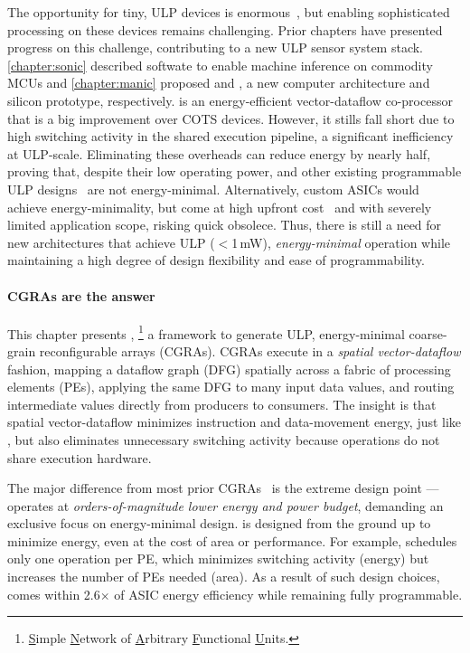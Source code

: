 The opportunity for tiny, ULP devices is enormous~\cite{lucia2017intermittent}, but enabling sophisticated processing on these devices remains challenging.
% 
Prior chapters have presented progress on this challenge, contributing to a new ULP sensor system stack.
% 
\autoref{chapter:sonic} described softwate to enable machine inference on commodity MCUs and \autoref{chapter:manic} proposed \manic and \msilicon, a new computer architecture and silicon prototype, respectively.
% 
\manic is an energy-efficient vector-dataflow co-processor that is a big improvement over COTS devices.
% 
However, it stills fall short due to high switching activity
in the shared execution pipeline, a significant inefficiency at ULP-scale.
% 
Eliminating these overheads can reduce energy by nearly half, proving that, despite their low operating power, \manic and other existing programmable ULP designs~\cite{dally:ieee08:elm,hempstead2005ultra,warneke200417,nazhandali2005energy} are not energy-minimal.
% 
Alternatively, custom ASICs would achieve energy-minimality, but come at high upfront cost~\cite{hotmobile2021} and with severely limited application scope, risking quick obsolece.
% 
Thus, there is still a need for new architectures that achieve ULP ($<$1\,mW), \emph{energy-minimal} operation while maintaining a high degree of design flexibility and ease of programmability.

\paragraph{\Ulp CGRAs are the answer}
%
This chapter presents \snafuframe,%
\footnote{\underline{S}imple \underline{N}etwork of \underline{A}rbitrary \underline{F}unctional \underline{U}nits.}
a framework to generate ULP, energy-minimal coarse-grain reconfigurable arrays (CGRAs).
%
\snafuframe CGRAs execute in a \emph{spatial vector-dataflow} fashion,
mapping a dataflow graph (DFG) spatially across a fabric of processing elements (PEs),
applying the same DFG to many input data values,
and routing intermediate values directly from producers to consumers.
%
The insight is that spatial vector-dataflow minimizes instruction and data-movement energy, just like \manic,
but also eliminates unnecessary switching activity because operations do not share execution hardware.

The major difference from most prior CGRAs~\cite{plasticine,dyser,nowatzki:isca17:stream-dataflow,goldstein2000piperench,trips,weng2020dsagen,weng2020hybrid,voitsechov2014single,mishra2006tartan,tan2018stitch,karunaratne2017hycube,voitsechov2018inter,evx} is the extreme design point
--- \snafuframe operates at \emph{orders-of-magnitude lower energy and power budget},
demanding an exclusive focus on energy-minimal design.
%
\snafuframe is designed from the ground up to minimize energy, even at
the cost of area or performance.
%
For example, \snafuframe schedules only one operation per PE, which
minimizes switching activity (energy) but increases the number of PEs needed (area).
%
As a result of such design choices, \snafuframe comes within 2.6$\times$
of ASIC energy efficiency while remaining fully programmable.
%

